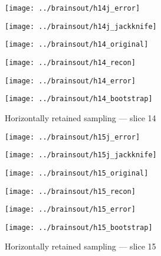 \documentclass[review,supplement,onefignum,onetabnum,juq]{siamonline181217}
\begin{document}
\begin{figure}
\begin{centering}

\parbox{\imsize}{\texttt{[image: ../brainsout/h14j\_error]}}
\parbox{\imsize}{\texttt{[image: ../brainsout/h14j\_jackknife]}}

\vspace{\vertsep}

\parbox{\imsize}{\texttt{[image: ../brainsout/h14\_original]}}
\parbox{\imsize}{\texttt{[image: ../brainsout/h14\_recon]}}

\vspace{\vertsep}

\parbox{\imsize}{\texttt{[image: ../brainsout/h14\_error]}}
\parbox{\imsize}{\texttt{[image: ../brainsout/h14\_bootstrap]}}

\end{centering}
\caption{Horizontally retained sampling --- slice 14}
\end{figure}


\begin{figure}
\begin{centering}

\parbox{\imsize}{\texttt{[image: ../brainsout/h15j\_error]}}
\parbox{\imsize}{\texttt{[image: ../brainsout/h15j\_jackknife]}}

\vspace{\vertsep}

\parbox{\imsize}{\texttt{[image: ../brainsout/h15\_original]}}
\parbox{\imsize}{\texttt{[image: ../brainsout/h15\_recon]}}

\vspace{\vertsep}

\parbox{\imsize}{\texttt{[image: ../brainsout/h15\_error]}}
\parbox{\imsize}{\texttt{[image: ../brainsout/h15\_bootstrap]}}

\end{centering}
\caption{Horizontally retained sampling --- slice 15}
\end{figure}
\end{document}
